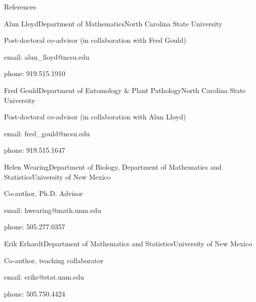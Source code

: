 \documentclass{resume} %
\begin{document}
\begin{rSection}{References}
\begin{rSubsection}{Alun Lloyd}{}{Department of Mathematics}{North Carolina State University}
\item Post-doctoral co-advisor (in collaboration with Fred Gould)
\item email: alun\_lloyd@ncsu.edu
\item phone:  919.515.1910
\end{rSubsection}
\begin{rSubsection}{Fred Gould}{}{Department of Entomology \& Plant Pathology}{North Carolina State University}
\item Post-doctoral co-advisor (in collaboration with Alun Lloyd)
\item email: fred\_gould@ncsu.edu
\item phone: 919.515.1647 
\end{rSubsection}
\begin{rSubsection}{Helen Wearing}{}{Department of Biology, Department of Mathematics and Statistics}{University of New Mexico}
\item Co-author, Ph.D. Advisor
\item email: hwearing@math.unm.edu
\item phone: 505.277.0357
\end{rSubsection}
\begin{rSubsection}{Erik Erhardt}{}{Department of Mathematics and Statistics}{University of New Mexico}
\item Co-author, teaching collaborator
\item email: erike@stat.unm.edu
\item phone: 505.750.4424
\end{rSubsection}
\end{rSection}





\end{document}
